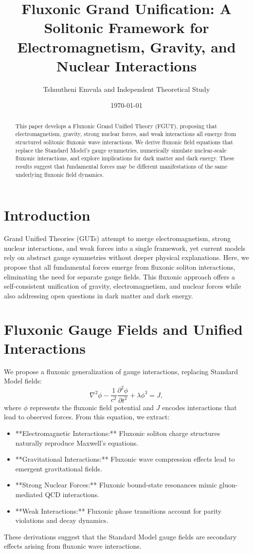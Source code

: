 \documentclass{article}
\title{Fluxonic Grand Unification: A Solitonic Framework for Electromagnetism, Gravity, and Nuclear Interactions}
\author{Tshuutheni Emvula and Independent Theoretical Study}
\date{\today}
\begin{document}
\maketitle

\begin{abstract}
This paper develops a Fluxonic Grand Unified Theory (FGUT), proposing that electromagnetism, gravity, strong nuclear forces, and weak interactions all emerge from structured solitonic fluxonic wave interactions. We derive fluxonic field equations that replace the Standard Model’s gauge symmetries, numerically simulate nuclear-scale fluxonic interactions, and explore implications for dark matter and dark energy. These results suggest that fundamental forces may be different manifestations of the same underlying fluxonic field dynamics.
\end{abstract}

\section{Introduction}
Grand Unified Theories (GUTs) attempt to merge electromagnetism, strong nuclear interactions, and weak forces into a single framework, yet current models rely on abstract gauge symmetries without deeper physical explanations. Here, we propose that all fundamental forces emerge from fluxonic soliton interactions, eliminating the need for separate gauge fields. This fluxonic approach offers a self-consistent unification of gravity, electromagnetism, and nuclear forces while also addressing open questions in dark matter and dark energy.

\section{Fluxonic Gauge Fields and Unified Interactions}
We propose a fluxonic generalization of gauge interactions, replacing Standard Model fields:
\begin{equation}
    \nabla^2 \phi - \frac{1}{c^2} \frac{\partial^2 \phi}{\partial t^2} + \lambda \phi^3 = J,
\end{equation}
where \( \phi \) represents the fluxonic field potential and \( J \) encodes interactions that lead to observed forces. From this equation, we extract:
\begin{itemize}
    \item **Electromagnetic Interactions:** Fluxonic soliton charge structures naturally reproduce Maxwell’s equations.
    \item **Gravitational Interactions:** Fluxonic wave compression effects lead to emergent gravitational fields.
    \item **Strong Nuclear Forces:** Fluxonic bound-state resonances mimic gluon-mediated QCD interactions.
    \item **Weak Interactions:** Fluxonic phase transitions account for parity violations and decay dynamics.
\end{itemize}
These derivations suggest that the Standard Model gauge fields are secondary effects arising from fluxonic wave interactions.
\end{document}
